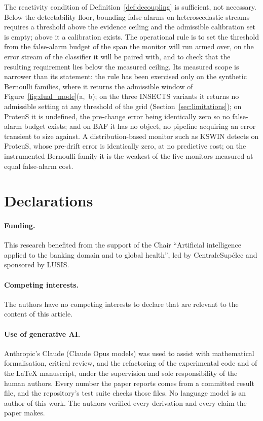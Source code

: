 \documentclass[smallextended]{svjour3}
\begin{document}
The reactivity condition of Definition~\ref{def:decoupling} is sufficient, not necessary. Below the detectability floor, bounding false alarms on heteroscedastic streams requires a threshold above the evidence ceiling and the admissible calibration set is empty; above it a calibration exists. The operational rule is to set the threshold from the false-alarm budget of the span the monitor will run armed over, on the error stream of the classifier it will be paired with, and to check that the resulting requirement lies below the measured ceiling. Its measured scope is narrower than its statement: the rule has been exercised only on the synthetic Bernoulli families, where it returns the admissible window of Figure~\ref{fig:dual_mode}(a,~b); on the three INSECTS variants it returns no admissible setting at any threshold of the grid (Section~\ref{sec:limitations}); on ProteuS it is undefined, the pre-change error being identically zero so no false-alarm budget exists; and on BAF it has no object, no pipeline acquiring an error transient to size against. A distribution-based monitor such as KSWIN detects on ProteuS, whose pre-drift error is identically zero, at no predictive cost; on the instrumented Bernoulli family it is the weakest of the five monitors measured at equal false-alarm cost.

\section*{Declarations}

\paragraph{Funding.} This research benefited from the support of the Chair ``Artificial intelligence applied to the banking domain and to global health'', led by CentraleSup\'elec and sponsored by LUSIS.

\paragraph{Competing interests.} The authors have no competing interests to declare that are relevant to the content of this article.

\paragraph{Use of generative AI.} Anthropic's Claude (Claude Opus models) was used to assist with mathematical formalisation, critical review, and the refactoring of the experimental code and of the \LaTeX{} manuscript, under the supervision and sole responsibility of the human authors. Every number the paper reports comes from a committed result file, and the repository's test suite checks those files. No language model is an author of this work. The authors verified every derivation and every claim the paper makes.
\end{document}
